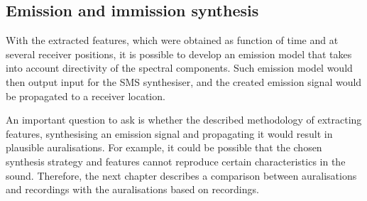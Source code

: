 




\subsection{Emission and immission synthesis}\label{sec:tool:synthesis:synthesis}
With the extracted features, which were obtained as function of time and at
several receiver positions, it is possible to develop an emission model that
takes into account directivity of the spectral components. Such emission model
would then output input for the SMS synthesiser, and the created emission signal
would be propagated to a receiver location.

An important question to ask is whether the described methodology of extracting
features, synthesising an emission signal and propagating it would result in
plausible auralisations. For example, it could be possible that the chosen
synthesis strategy and features cannot reproduce certain characteristics in the
sound. Therefore, the next chapter describes a comparison between auralisations
and recordings with the auralisations based on recordings.

